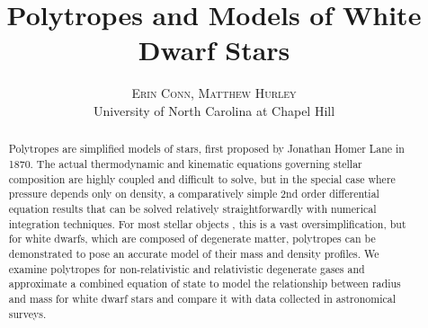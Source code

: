 \documentclass[twoside]{article}
\title{\vspace{-15mm}\fontsize{24pt}{10pt}\selectfont\textbf{Polytropes and
Models of White Dwarf Stars}} %
\author{
\large
\textsc{Erin Conn, Matthew Hurley}\\[2mm] %
\normalsize University of North Carolina at Chapel Hill \\ %
\vspace{-5mm}
}
\date{}
\begin{document}
\maketitle %

\thispagestyle{fancy} %


\begin{abstract}

\noindent 
Polytropes are simplified models of stars, first proposed by Jonathan Homer
Lane in 1870. The actual thermodynamic and kinematic equations governing stellar
composition are highly coupled and difficult to solve, but in the special case
where pressure depends only on density, a comparatively simple 2nd order
differential equation results that can be solved relatively straightforwardly
with numerical integration techniques. For most stellar objects , this is a vast
oversimplification, but for white dwarfs, which are composed of degenerate
matter, polytropes can be demonstrated to pose an accurate model of their mass
and density profiles. We examine polytropes for non-relativistic and
relativistic degenerate gases and approximate a combined equation of state to
model the relationship between radius and mass for white dwarf stars and compare
it with data collected in astronomical surveys.

\end{abstract}

\end{document}
